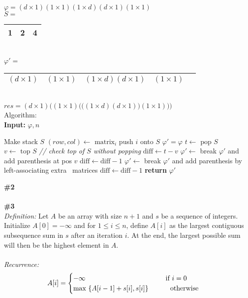 \documentclass{article}
\newcommand\tab[1][1cm]{\hspace*{#1}}
\begin{document}
\\
\\
$\varphi = (d \times 1)(1 \times 1)(1 \times d)(d \times 1)(1 \times 1)$
\\
$S = $
\begin{tabular}{ |c|c|c| } 
 \hline
 1 & 2 & 4\\
 \hline
\end{tabular}
\\
$\varphi' = $
\begin{tabular}{ |c|c|c|c|c } 
 \hline
 $(d \times 1)$ & $(1 \times 1)$ & $(1 \times d)(d \times 1)$ & $(1 \times 1)$ \\
 \hline
\end{tabular}
\\
$res = (d \times 1) \bigg((1 \times 1) \bigg( \bigg( (1 \times d) (d \times 1) \bigg) (1 \times 1) \bigg) \bigg) $
\\
Algorithm:\\
\textbf{Input:} $\varphi, n$
\begin{algorithmic}
\State Make stack $S$
  \State $(row, col) \gets \text{ matrix}_i$
    \State push $i$ onto $S$
  \EndIf
\EndFor
\State $\varphi' = \varphi$
  \State $t \gets \text{ pop } S$
  \State $v \gets \text{ top } S$ \textit{// check top of $S$ without popping}
  \State $\text{diff} \gets t - v$
    \State $\varphi' \gets$ break $\varphi'$ and add parenthesis at pos $v$
    \State $\text{diff} \gets \text{diff} - 1$
      \State $\varphi' \gets$ break $\varphi'$ and add parenthesis by left-associating extra \tab\tab\ matrices 
      \State $\text{diff} \gets \text{diff} - 1$
    \EndWhile
  \EndIf
\EndWhile
\State \textbf{return} $\varphi'$
\\
\end{algorithmic}
\textbf{\#2}
\\
\\
\textbf{\#3}\\
\textit{Definition:} Let $A$ be an array with size $n+1$ and $s$ be a sequence of integers. Initialize $A[0] = - \infty$ and for $1 \leq i \leq n$, define $A[i]$ as the largest contiguous subsequence sum in $s$ after an iteration $i$.  At the end, the largest possible sum will then be the highest element in $A$.\\
\\
\textit{Recurrence:}
\begin{gather*}
A[i] =
\begin{cases}
-\infty \tab\tab\tab\tab\text{   } $if $i = 0 \\
\text{max } \{A[i-1] + s[i], s[i]\} \tab $ otherwise $
\end{cases}
\end{gather*}\\
\end{document}
